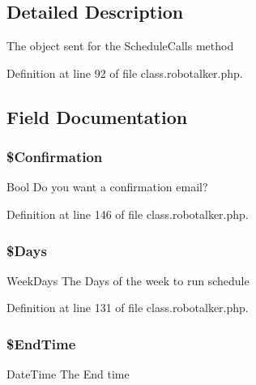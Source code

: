 \subsection{Detailed Description}
The object sent for the Schedule\-Calls method 

Definition at line 92 of file class.\-robotalker.\-php.



\subsection{Field Documentation}
\hypertarget{class_schedule_calls_request_of_int32_afcd9214c7e03e9e066611fb7ee041fb9}{
\subsubsection[{\$\-Confirmation}]{\setlength{\rightskip}{0pt plus 5cm}\$Confirmation}}\label{class_schedule_calls_request_of_int32_afcd9214c7e03e9e066611fb7ee041fb9}
Bool Do you want a confirmation email? 

Definition at line 146 of file class.\-robotalker.\-php.

\hypertarget{class_schedule_calls_request_of_int32_a541b96a58d5cadab10a165a562fc066e}{
\subsubsection[{\$\-Days}]{\setlength{\rightskip}{0pt plus 5cm}\$Days}}\label{class_schedule_calls_request_of_int32_a541b96a58d5cadab10a165a562fc066e}
Week\-Days The Days of the week to run schedule 

Definition at line 131 of file class.\-robotalker.\-php.

\hypertarget{class_schedule_calls_request_of_int32_ab7205c64d4caf57ad5c439d161116d8e}{
\subsubsection[{\$\-End\-Time}]{\setlength{\rightskip}{0pt plus 5cm}\$End\-Time}}\label{class_schedule_calls_request_of_int32_ab7205c64d4caf57ad5c439d161116d8e}
Date\-Time The End time 

